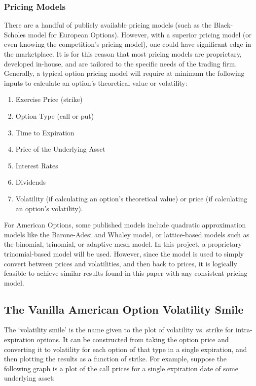 \documentclass[12pt, a4paper, notitlepage]{article}
\numberwithin{equation}{subsection}
\numberwithin{figure}{subsection}
\numberwithin{table}{subsection}
\begin{document}
\subsubsection{Pricing Models}\label{sec:PricingModels}
There are a handful of publicly available pricing models (such as the Black-Scholes model for European Options).  However, with a superior pricing model (or even knowing the competition's pricing model), one could have significant edge in the marketplace.  It is for this reason that most pricing models are proprietary, developed in-house, and are tailored to the specific needs of the trading firm.  Generally, a typical option pricing model will require at minimum the following inputs to calculate an option's theoretical value or volatility:
\begin{enumerate}
	\item	Exercise Price (strike)
    \item	Option Type (call or put)
    \item	Time to Expiration
    \item	Price of the Underlying Asset
    \item	Interest Rates
    \item	Dividends
    \item	Volatility (if calculating an option's theoretical value) or price (if calculating an option's volatility).
\end{enumerate}
For American Options, some published models include quadratic approximation models like the Barone-Adesi and Whaley model, or lattice-based models such as the binomial, trinomial, or adaptive mesh model.  In this project, a proprietary trinomial-based model will be used.  However, since the model is used to simply convert between prices and volatilities, and then back to prices, it is logically feasible to achieve similar results found in this paper with any consistent pricing model.

\subsection{The Vanilla American Option Volatility Smile}
The `volatility smile' is the name given to the plot of volatility vs. strike for intra-expiration options.  It can be constructed from taking the option price and converting it to volatility for each option of that type in a single expiration, and then plotting the results as a function of strike.  For example, suppose the following graph is a plot of the call prices for a single expiration date of some underlying asset:
\end{document}
